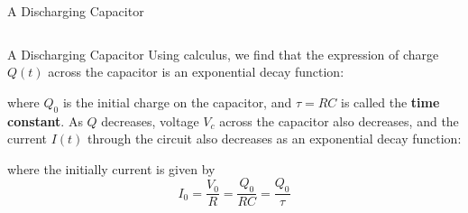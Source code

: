 \documentclass[12pt,aspectratio=169]{beamer}
\begin{document}
\begin{frame}{A Discharging Capacitor}
  \begin{center}
  \end{center}
  \begin{columns}[T]
    
  \end{columns}
\end{frame}



\begin{frame}{A Discharging Capacitor}
  Using calculus, we find that the expression of charge $Q(t)$ across the
  capacitor is an exponential decay function:

  
  \vspace{-.1in}where $Q_0$ is the initial charge on the
  capacitor, and $\tau=RC$ is called the \textbf{time constant}. As $Q$
  decreases, voltage $V_c$ across the capacitor also decreases, and the current
  $I(t)$ through the circuit also decreases as an exponential decay function:


  \vspace{-.1in}where the initially current is given by
  \begin{displaymath}
    I_0=\frac{V_0}R=\frac{Q_0}{RC}=\frac{Q_0}\tau
  \end{displaymath}
\end{frame}
\end{document}
